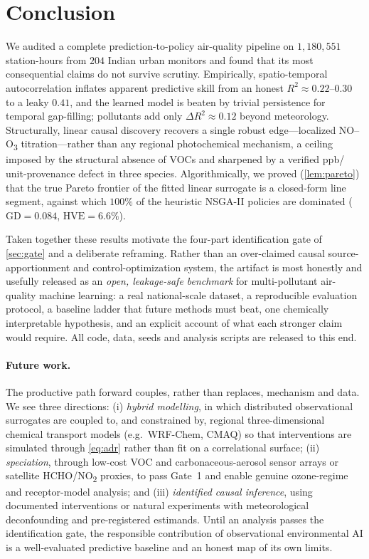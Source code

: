 \section{Conclusion}
\label{sec:conclusion}

We audited a complete prediction-to-policy air-quality pipeline on $1{,}180{,}551$
station-hours from $204$ Indian urban monitors and found that its most consequential
claims do not survive scrutiny. Empirically, spatio-temporal autocorrelation inflates
apparent predictive skill from an honest $R^2\approx0.22$--$0.30$ to a leaky $0.41$,
and the learned model is beaten by trivial persistence for temporal gap-filling;
pollutants add only $\Delta R^2\approx0.12$ beyond meteorology. Structurally, linear
causal discovery recovers a single robust edge---localized NO--O\textsubscript{3}
titration---rather than any regional photochemical mechanism, a ceiling imposed by the
structural absence of VOCs and sharpened by a verified ppb/\ugm{} unit-provenance
defect in three species. Algorithmically, we proved (\cref{lem:pareto}) that the true
Pareto frontier of the fitted linear surrogate is a closed-form line segment, against
which $100\%$ of the heuristic NSGA-II policies are dominated
($\mathrm{GD}=0.084$, $\mathrm{HVE}=6.6\%$).

Taken together these results motivate the four-part identification gate of
\cref{sec:gate} and a deliberate reframing. Rather than an over-claimed causal
source-apportionment and control-optimization system, the artifact is most honestly
and usefully released as an \emph{open, leakage-safe benchmark} for multi-pollutant
air-quality machine learning: a real national-scale dataset, a reproducible
evaluation protocol, a baseline ladder that future methods must beat, one
chemically interpretable hypothesis, and an explicit account of what each stronger
claim would require. All code, data, seeds and analysis scripts are released to this
end.

\paragraph{Future work.}
The productive path forward couples, rather than replaces, mechanism and data. We see
three directions: (i) \emph{hybrid modelling}, in which distributed observational
surrogates are coupled to, and constrained by, regional three-dimensional chemical
transport models (e.g.\ WRF-Chem, CMAQ) so that interventions are simulated through
\eqref{eq:adr} rather than fit on a correlational surface; (ii) \emph{speciation},
through low-cost VOC and carbonaceous-aerosol sensor arrays or satellite
HCHO/NO\textsubscript{2} proxies, to pass Gate~1 and enable genuine ozone-regime and
receptor-model analysis; and (iii) \emph{identified causal inference}, using documented
interventions or natural experiments with meteorological deconfounding and
pre-registered estimands. Until an analysis passes the identification gate, the
responsible contribution of observational environmental AI is a well-evaluated
predictive baseline and an honest map of its own limits.

